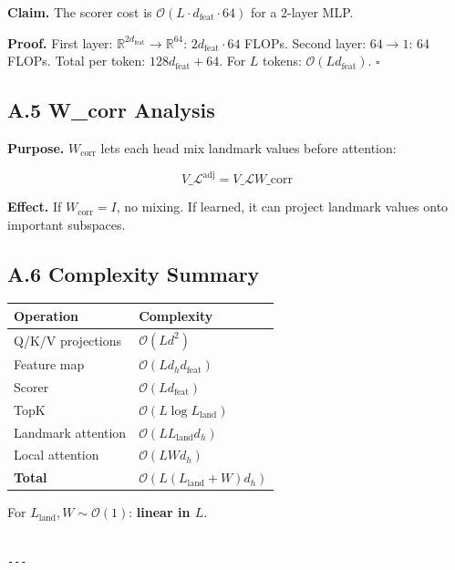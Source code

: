 \textbf{Claim.} The scorer cost is $\mathcal{O}(L \cdot d_\text{feat} \cdot 64)$ 
for a 2-layer MLP.

\textbf{Proof.} First layer: $\mathbb{R}^{2 d_\text{feat}} \to \mathbb{R}^{64}$: 
$2 d_\text{feat} \cdot 64$ FLOPs. Second layer: $64 \to 1$: 64 FLOPs. Total 
per token: $128 d_\text{feat} + 64$. For $L$ tokens: $\mathcal{O}(L d_\text{feat})$. $\square$

\subsection{A.5 W\_corr Analysis}

\textbf{Purpose.} $W_\text{corr}$ lets each head mix landmark values before 
attention:

\[
V\_\mathcal{L}^\text{adj} = V\_\mathcal{L} W\_\text{corr}
\tag{A.7}
\]

\textbf{Effect.} If $W_\text{corr} = I$, no mixing. If learned, it can project 
landmark values onto important subspaces.

\subsection{A.6 Complexity Summary}

\begin{table}[H]
\centering
\small
\begin{tabular}{ll}
\toprule
\textbf{Operation} & \textbf{Complexity} \\
\midrule
Q/K/V projections & $\mathcal{O}(L d^2)$ \\
Feature map & $\mathcal{O}(L d_h d_\text{feat})$ \\
Scorer & $\mathcal{O}(L d_\text{feat})$ \\
TopK & $\mathcal{O}(L \log L_\text{land})$ \\
Landmark attention & $\mathcal{O}(L L_\text{land} d_h)$ \\
Local attention & $\mathcal{O}(L W d_h)$ \\
\textbf{Total} & $\mathcal{O}(L(L_\text{land} + W) d_h)$ \\
\bottomrule
\end{tabular}
\end{table}

For $L_\text{land}, W \sim \mathcal{O}(1)$: \textbf{linear in $L$}.
\begin{lstlisting}

---
\end{lstlisting}

